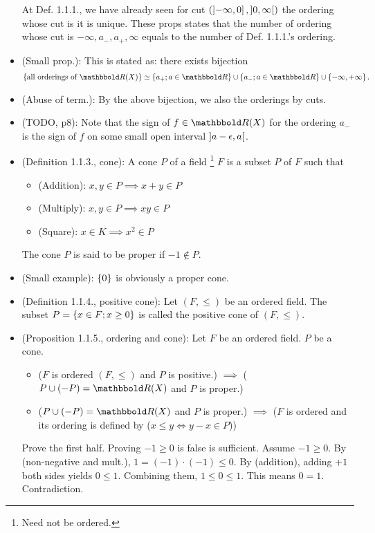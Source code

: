 \documentclass[9pt]{ltjsarticle}
\begin{document}
\begin{itemize}
  \pf At Def. 1.1.1., we have already seen for cut $(\left]-\infty,0\right],\left] 0,\infty \right[)$
  the ordering whose cut is it is unique.
  These props states that the number of ordering whose cut is
  $-\infty,a_-,a_+,\infty$ equals to
  the number of Def. 1.1.1.'s ordering.
  \item
  (Small prop.):
  This is stated as:
  there exists bijection
  \begin{align}
    \set{\text{all orderings of }\R (X)} \simeq \set{a_+; a\in \R} \cup \set{a_-; a\in \R} \cup \set{-\infty,+\infty}.
  \end{align}
  \item
  (Abuse of term.):
  By the above bijection, we also the orderings by cuts.
  \item
  (TODO, p8):
  Note that the sign of $f\in \R (X)$ for the ordering $a_-$
  is the sign of $f$ on some small open interval $\left] a-\epsilon,a \right[$.
  \item
  (Definition 1.1.3., cone):
  A cone $P$ of a field \footnote{Need not be ordered.} $F$ is a subset $P$ of $F$ such that
  \begin{itemize}
    \item (Addition): $x,y\in P \implies x+y\in P$
    \item (Multiply): $x,y\in P \implies xy \in P$
    \item (Square): $x\in K \implies x^2 \in P$
  \end{itemize}
  The cone $P$ is said to be proper if $-1 \notin P$.
  \item
  (Small example): $\left\{0\right\}$ is obviously a proper cone.
  \item
  (Definition 1.1.4., positive cone):
  Let $(F,\le)$ be an ordered field.
  The subset $P=\left\{x\in F; x\ge 0\right\}$ is called the positive cone
  of $(F,\le)$.
  \item
  (Proposition 1.1.5., ordering and cone):
  Let $F$ be an ordered field.
  $P$ be a cone.
  \begin{itemize}
    \item
    ($F$ is ordered $(F,\le)$ and $P$ is positive.)
      $\implies$
    ($P\cup (-P) = \R (X)$ and $P$ is proper.)
    \item
    ($P\cup (-P)=\R (X)$ and $P$ is proper.)
    $\implies$
    ($F$ is ordered and its ordering is defined by ($x\le y \iff y-x\in P$))
  \end{itemize}

  \pf
  Prove the first half.
  Proving $-1\ge 0$ is false is sufficient.
  Assume $-1 \ge 0$.
  By (non-negative and mult.), $1 = (-1)\cdot (-1) \le 0$.
  By (addition), adding $+1$ both sides yields $0\le 1$.
  Combining them, $1\le 0 \le 1$.  This means $0=1$.  Contradiction.


\end{itemize}
\end{document}

